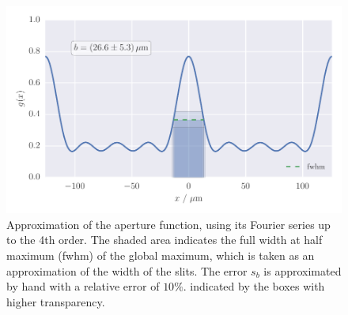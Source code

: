 \begin{figure}
    \centering
    \includegraphics[width=\textwidth]{figures/aperture_function}
    \caption{
        Approximation of the aperture function, using its Fourier series up to the 
        4th order. The shaded area indicates the full width at half maximum (fwhm) 
        of the global maximum, which is taken as an approximation of the width of the 
        slits. The error $s_b$ is approximated by hand with a relative error of $10\%$. 
        indicated by the boxes with higher transparency. 
        }
    \label{fig:aperture_function}
\end{figure}
\FloatBarrier

